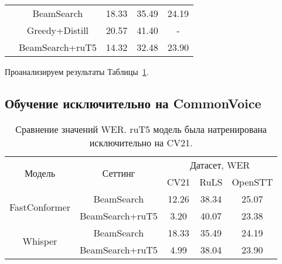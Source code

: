 \begin{table}[]
\begin{tabular}{|c|c|ccc|}
                               & BeamSearch                           & \multicolumn{1}{c|}{18.33} & \multicolumn{1}{c|}{35.49}    & 24.19   \\ \cline{2-5} 
                               & Greedy+Distill                       & \multicolumn{1}{c|}{20.57} & \multicolumn{1}{c|}{41.40}    & -       \\ \cline{2-5} 
                               & BeamSearch+ruT5                      & \multicolumn{1}{c|}{14.32} & \multicolumn{1}{c|}{32.48}    & 23.90   \\ \hline
\end{tabular}
\label{tab:res_full}
\end{table}

Проанализируем результаты Таблицы~\ref{tab:res_full}.

\subsection{Обучение исключительно на CommonVoice}
\begin{table}[]
\centering
\caption{Сравнение значений WER. ruT5 модель была натренирована исключительно на CV21.}
\begin{tabular}{|c|c|ccc|}
\hline
\multirow{2}{*}{Модель}        & \multirow{2}{*}{Сеттинг}             & \multicolumn{3}{c|}{Датасет, WER}                                    \\ \cline{3-5} 
                               &                                      & \multicolumn{1}{c|}{CV21}  & \multicolumn{1}{c|}{RuLS}     & OpenSTT \\ \hline
\multirow{2}{*}{FastConformer} & BeamSearch                           & \multicolumn{1}{c|}{12.26} & \multicolumn{1}{c|}{38.34}    & 25.07   \\ \cline{2-5} 
                               & BeamSearch+ruT5                      & \multicolumn{1}{c|}{3.20}  & \multicolumn{1}{c|}{40.07}    & 23.38   \\ \hline
\multirow{2}{*}{Whisper}       & BeamSearch                           & \multicolumn{1}{c|}{18.33} & \multicolumn{1}{c|}{35.49}    & 24.19   \\ \cline{2-5} 
                               & BeamSearch+ruT5                      & \multicolumn{1}{c|}{4.99}  & \multicolumn{1}{c|}{38.04}    & 23.90   \\ \hline
\end{tabular}
\label{tab:res_cv_trained}
\end{table}


